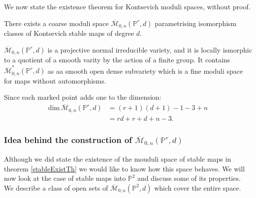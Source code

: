 \par We now state the existence theorem for Kontsevich moduli spaces, without proof.

\begin{theorem}
    \label{stableExistTh}
    There exists a coarse moduli space $\overline{\mathcal{M}}_{0,n}(\mathbb{P}^{r},d)$ parametrising isomorphism classes of Kontsevich stable maps of degree $d$.
\end{theorem}

\begin{theorem}
    $\overline{\mathcal{M}}_{0,n}(\mathbb{P}^{r},d)$ is a projective normal irreducible variety, and it is locally ismorphic to a quotient of a smooth varity by the action of a finite group.
    It contains $\overline{\mathcal{M}}^{*}_{0,n}(\mathbb{P}^{r},d)$ as aa smooth open dense subvariety which is a fine moduli space for maps without automorphisms.
\end{theorem}
\begin{remark}
    Since each marked point adds one to the dimension:
    \begin{align*}
        \text{dim}\,\overline{\mathcal{M}}_{0,n}(\mathbb{P}^{r},d) &= (r+1)(d+1) - 1 - 3 +n\\
                                                                 &= rd + r + d + n - 3.
    \end{align*}
\end{remark}
\subsubsection{Idea behind the construction of $\overline{\mathcal{M}}_{0,n}(\mathbb{P}^{r},d)$}
Although we did state the existence of the mouduli space of stable maps in theorem \ref{stableExistTh} we would like to know how this space behaves.
We will now look at the case of stable maps into $\mathbb{P}^{2}$ and discuss some of its properties.
We describe a class of open sets of $\overline{\mathcal{M}}_{0,n}(\mathbb{P}^{2},d)$ which cover the entire space.

